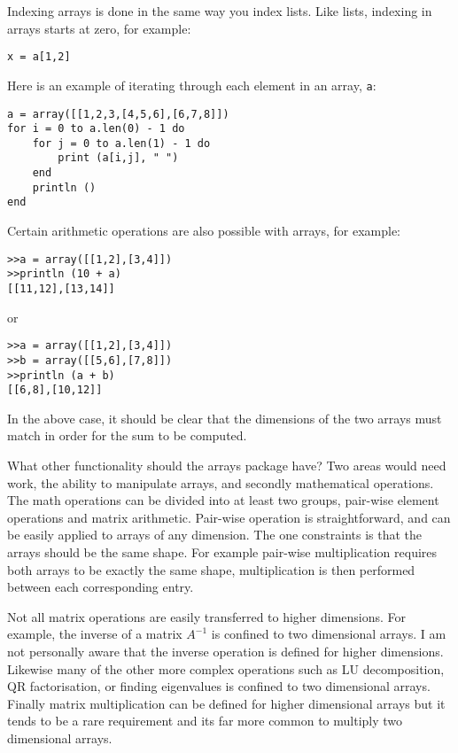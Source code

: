 Indexing arrays is done in the same way you index lists. Like lists, indexing in arrays starts at zero, for example:

\begin{lstlisting}
x = a[1,2]
\end{lstlisting}

Here is an example of iterating through each element in an array, {\tt a}:

\begin{lstlisting}
a = array([[1,2,3,[4,5,6],[6,7,8]])
for i = 0 to a.len(0) - 1 do
    for j = 0 to a.len(1) - 1 do
        print (a[i,j], " ")
    end
    println ()
end
\end{lstlisting}

Certain arithmetic operations are also possible with arrays, for example:

\begin{lstlisting}
>>a = array([[1,2],[3,4]])
>>println (10 + a)
[[11,12],[13,14]]
\end{lstlisting}

or

\begin{lstlisting}
>>a = array([[1,2],[3,4]])
>>b = array([[5,6],[7,8]])
>>println (a + b)
[[6,8],[10,12]]
\end{lstlisting}

In the above case, it should be clear that the dimensions of the two arrays must match in order for the sum to be computed.

What other functionality should the arrays package have? Two areas would need work, the ability to manipulate arrays, and secondly mathematical operations. The math operations can be divided into at least two groups, pair-wise element operations and matrix arithmetic. Pair-wise operation is straightforward, and can be easily applied to arrays of any dimension. The one constraints is that the arrays should be the same shape. For example pair-wise multiplication requires both arrays to be exactly the same shape, multiplication is then performed between each corresponding entry.

Not all matrix operations are easily transferred to higher dimensions. For example, the inverse of a matrix $A^{-1}$ is confined to two dimensional arrays. I am not personally aware that the inverse operation is defined for higher dimensions. Likewise many of the other more complex operations such as LU decomposition, QR factorisation, or finding eigenvalues is confined to two dimensional arrays. Finally matrix multiplication can be defined for higher dimensional arrays but it tends to be a rare requirement and its far more common to multiply two dimensional arrays.

